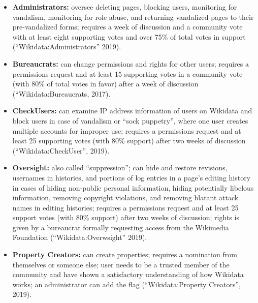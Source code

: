 \documentclass[]{article}
\begin{document}
\begin{itemize}
\item
  \textbf{Administrators:} oversee deleting pages, blocking users,
  monitoring for vandalism, monitoring for role abuse, and returning
  vandalized pages to their pre-vandalized forms; requires a week of
  discussion and a community vote with at least eight supporting votes
  and over 75\% of total votes in support (``Wikidata:Administrators''
  2019).
\item
  \textbf{Bureaucrats:} can change permissions and rights for other
  users; requires a permissions request and at least 15 supporting votes
  in a community vote (with 80\% of total votes in favor) after a week
  of discussion (``Wikidata:Bureaucrats, 2017).
\item
  \textbf{CheckUsers:} can examine IP address information of users on
  Wikidata and block users in case of vandalism or ``sock puppetry'',
  where one user creates multiple accounts for improper use; requires a
  permissions request and at least 25 supporting votes (with 80\%
  support) after two weeks of discussion (``Wikidata:CheckUser'', 2019).
\item
  \textbf{Oversight:} also called ``suppression''; can hide and restore
  revisions, usernames in histories, and portions of log entries in a
  page's editing history in cases of hiding non-public personal
  information, hiding potentially libelous information, removing
  copyright violations, and removing blatant attack names in editing
  histories; requires a permissions request and at least 25 support
  votes (with 80\% support) after two weeks of discussion; rights is
  given by a bureaucrat formally requesting access from the Wikimedia
  Foundation (``Wikidata:Overwsight'' 2019).
\item
  \textbf{Property Creators:} can create properties; requires a
  nomination from themselves or someone else; user needs to be a trusted
  member of the community and have shown a satisfactory understanding of
  how Wikidata works; an administrator can add the flag
  (``Wikidata:Property Creators'', 2019).
\end{itemize}
\end{document}
